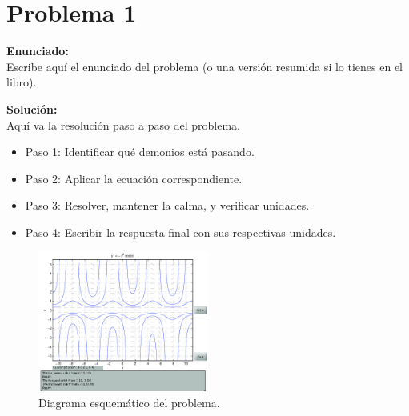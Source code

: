 \documentclass[10pt,a4paper]{article}
\begin{document}
\vspace{1em}

\section*{Problema 1}
\textbf{Enunciado:} \\
Escribe aquí el enunciado del problema (o una versión resumida si lo tienes en el libro).

\vspace{1em}
\textbf{Solución:} \\

Aquí va la resolución paso a paso del problema.

\begin{itemize}
  \item Paso 1: Identificar qué demonios está pasando.
  \item Paso 2: Aplicar la ecuación correspondiente.
  \item Paso 3: Resolver, mantener la calma, y verificar unidades.
  \item Paso 4: Escribir la respuesta final con sus respectivas unidades.
\end{itemize}

\begin{figure}[h]
\centering
\includegraphics[width=0.5\textwidth]{fig1.png}
\caption{Diagrama esquemático del problema.}
\end{figure}

\end{document}

